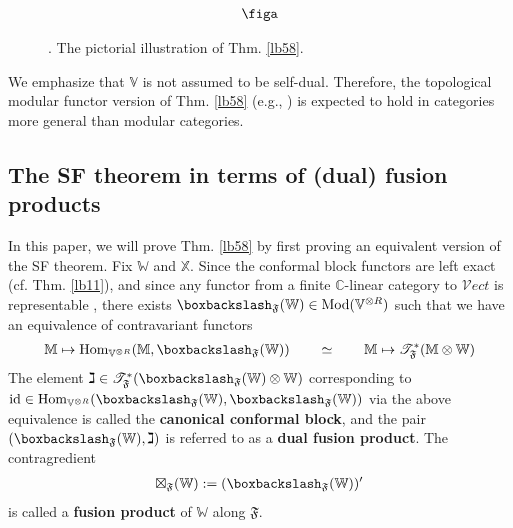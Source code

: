 \documentclass[11pt,b5paper,notitlepage]{article}
\theoremstyle{definition}
\theoremstyle{plain}
\newcommand{\Hom}{\mathrm{Hom}}
\newcommand{\Vect}{\mathcal Vect}
\newcommand{\Vbb}{\mathbb V}
\newcommand{\Xbb}{\mathbb X}
\newcommand{\Wbb}{\mathbb W}
\newcommand{\Mbb}{\mathbb M}
\newcommand{\Cbb}{\mathbb C}
\newcommand{\<}{\left\langle}
\renewcommand{\>}{\right\rangle}
\newcommand{\ST}{\mathscr{T}}
\newcommand{\bbs}{\boxbackslash}
\newcommand{\Mod}{\mathrm{Mod}}
\newcommand{\id}{\mathrm{id}}
\newcommand{\ff}{\mathfrak{F}}
\numberwithin{equation}{section}
\begin{document}
\begin{figure}[h]

	\centering

\begin{align*}
\figa
\end{align*}

	\caption{. The pictorial illustration of Thm. \ref{lb58}.}
	\label{fig3}
\end{figure} 


We emphasize that $\Vbb$ is not assumed to be self-dual. Therefore, the topological modular functor version of Thm. \ref{lb58} (e.g., \cite[Cor. 4.9]{HR24-MF}) is expected to hold in categories more general than modular categories.



\subsection{The SF theorem in terms of (dual) fusion products}


In this paper, we will prove Thm. \ref{lb58} by first proving an equivalent version of the SF theorem. Fix $\Wbb$ and $\Xbb$. Since the conformal block functors are left exact (cf. Thm. \ref{lb11}), and since any functor from a finite $\Cbb$-linear category to $\Vect$ is representable \cite[Cor. 1.10]{DSPS19-balanced}, there exists $\bbs_\ff(\Wbb)\in\Mod(\Vbb^{\otimes R})$ such that we have an equivalence of contravariant functors
\begin{align}\label{eq119}
\Mbb\mapsto\Hom_{\Vbb^{\otimes R}}(\Mbb,\bbs_\ff(\Wbb))\qquad\simeq\qquad\Mbb\mapsto\ST^*_\ff(\Mbb\otimes\Wbb)
\end{align}
The element $\gimel\in\ST^*_\ff(\bbs_\ff(\Wbb)\otimes\Wbb)$ corresponding to $\id\in\Hom_{\Vbb^{\otimes R}}(\bbs_\ff(\Wbb),\bbs_\ff(\Wbb))$ via the above equivalence is called the \textbf{canonical conformal block}, and the pair $(\bbs_\ff(\Wbb),\gimel)$ is referred to as a \textbf{dual fusion product}. The contragredient
\begin{align*}
\boxtimes_\ff(\Wbb):=(\bbs_\ff(\Wbb))'
\end{align*}
is called a \textbf{fusion product} of $\Wbb$ along $\ff$.
\end{document}
